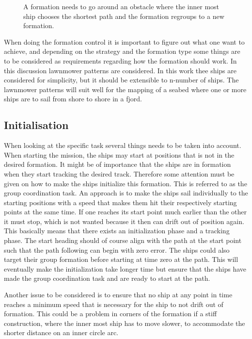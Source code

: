 \begin{figure}[htbp]
	\centering
	
	\caption{A formation needs to go around an obstacle where the inner most ship chooses the shortest path and the formation regroups to a new formation.}
	\label{fig:avoid}
\end{figure}

When doing the formation control it is important to figure out what one
want to achieve, and depending on the strategy and the formation type
some things are to be considered as requirements regarding how the
formation should work. In this discussion lawnmower patterns are considered. In this work thee ships are considered for simplicity, but it should be extensible to n-number of ships. The lawnmower patterns will suit well for the mapping of a seabed where one or more ships are to sail from shore to shore in a fjord.

\subsection{Initialisation}
\label{sc:initialisation}
When looking at the specific task several things needs to be taken into account. When starting the mission, the ships may start at positions that is not in the desired formation. It might be of importance that the ships are in
formation when they start tracking the desired track. Therefore some
attention must be given on how to make the ships initialize this
formation. This is referred to as the group coordination task. An approach is to make the ships sail individually to the
starting positions with a speed that makes them hit their respectively starting points at
the same time. If one reaches its start point much earlier
than the other it must stop, which is not wanted because it then can
drift out of position again. This basically means that there exists an initialization
phase and a tracking phase. The start heading should of
course align with the path at the start point such that the path following can begin with zero error. The ships could also target their group formation before starting at time zero at the path. This will eventually make the initialization take longer time but ensure that the ships have made the group coordination task and are ready to start at the path.

Another issue to be considered is to ensure that no ship at
any point in time reaches a minimum speed that is necessary for the
ship to not drift out of formation. This could be a problem in corners
of the formation if a stiff construction, where the inner most ship
has to move slower, to accommodate the shorter distance on an inner
circle arc.

